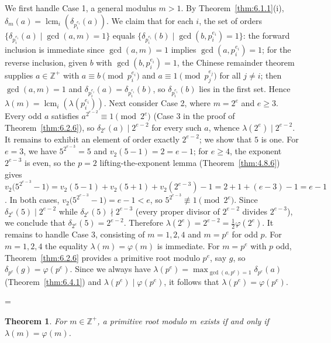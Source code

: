 \documentclass[11pt]{article}
\makeatletter
\theoremstyle{ntstyle}
\newtheorem{theorem}{Theorem}[subsection]
\let\nt@closedisplay\]
\def\nt@guardedclose{\@ifnextchar\par{\nt@closeafterpar}{\@ifnextchar\end{\postdisplaypenalty\@M\nt@closedisplay}{\nt@closedisplay}}}
\def\nt@closeafterpar\par{\@ifnextchar\par{\nt@closeafterpar}{\@ifnextchar\end{\postdisplaypenalty\@M\nt@closedisplay\par}{\nt@closedisplay\par}}}
\renewenvironment{proof}[1][\proofname]{\par
  \pushQED{\qed}\normalfont\topsep\medskipamount\edef\nt@afterproof{\@endparpenalty=\the\@endparpenalty\relax}\@beginparpenalty\@M\@endparpenalty\@M\let\]\nt@guardedclose\trivlist\item[]\textit{#1\@addpunct{.}} \ignorespaces}{\ifvmode\addpenalty\@M\fi\popQED\nt@afterproof\endtrivlist\@endpefalse}
\DeclareMathOperator{\lcm}{lcm}
\makeatother
\begin{document}
\begin{proof} We first handle Case 1, a general modulus $m>1$. By
	Theorem~\ref{thm:6.1.1}(i), $\delta_m(a) =
		\lcm_i(\delta_{p_i^{e_i}}(a))$. We claim that for each
	$i$, the set of orders $\{\delta_{p_i^{e_i}}(a) \mid \gcd(a, m)=1\}$
	equals $\{\delta_{p_i^{e_i}}(b) \mid \gcd(b, p_i^{e_i})=1\}$: the forward
	inclusion is immediate since $\gcd(a, m)=1$ implies
	$\gcd(a, p_i^{e_i})=1$; for the reverse inclusion, given $b$ with
	$\gcd(b, p_i^{e_i})=1$, the Chinese remainder theorem supplies
	$a \in \mathbb{Z}^+$ with $a \equiv b \pmod{p_i^{e_i}}$ and $a
		\equiv 1 \pmod{p_j^{e_j}}$ for all $j \neq i$; then $\gcd(a, m)=1$ and
	$\delta_{p_i^{e_i}}(a) = \delta_{p_i^{e_i}}(b)$, so
	$\delta_{p_i^{e_i}}(b)$ lies in the first set. Hence $\lambda(m) =
		\lcm_i(\lambda(p_i^{e_i}))$. Next consider Case 2, where $m = 2^{e}$ and $e \ge 3$. Every odd $a$ satisfies
	$a^{2^{e-2}} \equiv 1 \pmod{2^e}$ (Case 3 in the proof of
	Theorem~\ref{thm:6.2.6}), so
	$\delta_{2^e}(a) \mid 2^{e-2}$ for every such $a$, whence
	$\lambda(2^e) \mid 2^{e-2}$. It remains to exhibit an element of
	order exactly $2^{e-2}$; we show that $5$ is one. For $e = 3$,
	we have $5^{2^{e-3}} = 5$ and $v_2(5-1) = 2 = e-1$; for $e \ge 4$, the exponent $2^{e-3}$
	is even, so the $p=2$ lifting-the-exponent lemma (Theorem~\ref{thm:4.8.6}) gives $v_2\big(5^{2^{e-3}}
		- 1\big) = v_2(5-1) + v_2(5+1) + v_2(2^{e-3}) - 1 = 2 + 1 + (e-3) - 1
		= e-1$. In both cases, $v_2\big(5^{2^{e-3}} - 1\big) = e-1 < e$, so
	$5^{2^{e-3}} \not\equiv 1 \pmod{2^e}$. Since $\delta_{2^e}(5) \mid
		2^{e-2}$ while $\delta_{2^e}(5) \nmid 2^{e-3}$ (every proper divisor
	of $2^{e-2}$ divides $2^{e-3}$), we conclude that $\delta_{2^e}(5) =
		2^{e-2}$. Therefore $\lambda(2^{e}) = 2^{e-2} =
		\tfrac{1}{2}\varphi(2^{e})$. It remains to handle Case 3, consisting of $m = 1,2,4$ and $m=p^e$ for odd $p$. For $m=1,2,4$ the equality
	$\lambda(m)=\varphi(m)$ is immediate. For $m=p^e$ with $p$ odd,
	Theorem~\ref{thm:6.2.6} provides a primitive root modulo $p^e$, say $g$, so
	$\delta_{p^e}(g)=\varphi(p^e)$. Since we always have
	$\lambda(p^e)=\max_{\gcd(a, p^e)=1}\delta_{p^e}(a)$ (Theorem~\ref{thm:6.4.1}) and
	$\lambda(p^e)\mid\varphi(p^e)$, it follows that
	$\lambda(p^e)=\varphi(p^e)$.

\end{proof}
\begin{theorem}\label{thm:6.4.3} For $m\in\mathbb{Z}^+$, a primitive root modulo $m$ exists
	if and only if $\lambda(m) = \varphi(m)$.

\end{theorem}
\end{document}
